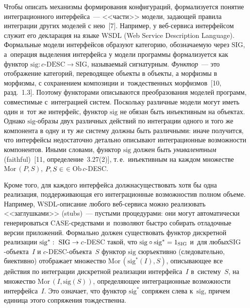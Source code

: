 \begin{multicols}{2}
 Чтобы описать механизмы формирования конфигураций, формализуется
понятие интеграционного интерфейса~--- <<части>> модели, задающей
правила интеграции других моделей с нею~[7]. \mbox{Например,} у веб-сер\-ви\-са
интерфейсом служит его декларация на языке WSDL
(Web Service Description Language). Формальные модели
интерфейсов образуют категорию, обо\-зна\-ча\-емую через $\mathrm{SIG}$, а~операция
выделения интерфейса у модели программы формализуется как функтор
 $\mathrm{sig}: c\mbox{-}\mathrm{DESC} \to \mathrm{SIG}$, называемый сигнатурным.
 \textit{Функтор}~--- это отображение категорий, переводящее объекты в
объекты, а морфизмы в морфизмы, с сохранением композиции
и~тождественных морфизмов~[10, разд.~1.3]. Поэтому функторами описываются
преобразования моделей программ, совместимые с~интеграцией систем.
Поскольку различные модели могут иметь один и~тот же интерфейс, функтор
$\mathrm{sig}$ не обязан быть инъективным на объектах. Однако $\mathrm{sig}$-обра\-зы двух
различных действий по интеграции одного и того же компонента в одну и ту же
сис\-те\-му должны быть различными: иначе получится, что интерфейсы
недостаточно детально описывают интеграционные возможности компонентов.
Иными словами, функтор $\mathrm{sig}$ должен быть \textit{унивалентным}
(faithful)~[11, определение~3.27(2)], т.\,е.\ инъективным на каждом множестве
$\mathrm{Mor}\,(P, S)$, $P, S \hm\in$\linebreak $\in \mathrm{Ob}\, c$-DESC.

 Кроме того, для каждого интерфейса должна\linebreak существовать хотя бы одна
реализация, поддер\-живающая его интеграционные возможности\linebreak в полном
объеме. Например, WSDL-описание \mbox{любого} веб-сер\-ви\-са можно реализовать
<<заглушками>> (stubs)~--- пустыми процедурами: они могут автоматически
генерироваться CASE-средст\-вами и~поз\-во\-ля\-ют быстро собирать отладочные\linebreak
версии приложений. Формально должен существовать функтор дискретной
реализации $\mathrm{sig}^*:\ \mathrm{SIG} \hm\to c$-DESC такой,
что $\mathrm{sig} \circ \mathrm{sig}^* \hm=
1_{\mathrm{SIG}}$ и~для любых\linebreak $\mathrm{SIG}$-объ\-ек\-та~$I$ и $c$-DESC-объ\-ек\-та~$S$ функтор
$\mathrm{sig}$ сюръективно (следовательно, биективно) отображает множество
$\mathrm{Mor}\,(\mathrm{sig}^*(I), S)$, описыва\-ющее все действия по интеграции
дискретной реализации интерфейса~$I$ в~сис\-те\-му~$S$, на мно\-жество
$\mathrm{Mor}\,(I, \mathrm{sig}(S))$, определяющее интеграционные возможности
интерфейса~$I$. Это означает, что функтор $\mathrm{sig}^*$ сопряжен слева к~$\mathrm{sig}$,
причем единица этого сопряжения тождественна.


\end{multicols}

